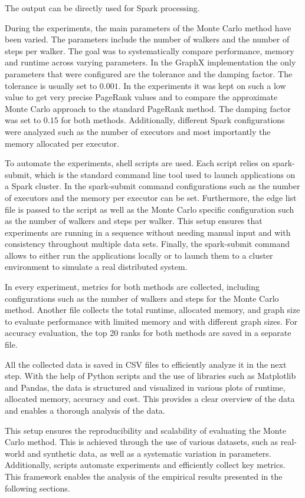 The output can be directly used for Spark processing.\par
During the experiments, the main parameters of the Monte Carlo method have been varied. The parameters include the number of walkers and the number of steps per walker. The goal was to systematically compare performance, memory and runtime across varying parameters. In the GraphX implementation the only parameters that were configured are the tolerance and the damping factor. The tolerance is usually set to $0.001$. In the experiments it was kept on such a low value to get very precise PageRank values and to compare the approximate Monte Carlo approach to the standard PageRank method. The damping factor was set to $0.15$ for both methods. Additionally, different Spark configurations were analyzed such as the number of executors and most importantly the memory allocated per executor. \par
To automate the experiments, shell scripts are used. Each script relies on spark-submit, which is the standard command line tool used to launch applications on a Spark cluster. In the spark-submit command configurations such as the number of executors and the memory per executor can be set. Furthermore, the edge list file is passed to the script as well as the Monte Carlo specific configuration such as the number of walkers and steps per walker. This setup ensures that experiments are running in a sequence without needing manual input and with consistency throughout multiple data sets. Finally, the spark-submit command allows to either run the applications locally or to launch them to a cluster environment to simulate a real distributed system. \par
In every experiment, metrics for both methods are collected, including configurations such as the number of walkers and steps for the Monte Carlo method. Another file collects the total runtime, allocated memory, and graph size to evaluate performance with limited memory and with different graph sizes. For accuracy evaluation, the top 20 ranks for both methods are saved in a separate file. \par
All the collected data is saved in CSV files to efficiently analyze it in the next step. With the help of Python scripts and the use of libraries such as Matplotlib and Pandas, the data is structured and visualized in various plots of runtime, allocated memory, accuracy and cost. This provides a clear overview of the data and enables a thorough analysis of the data. \par
This setup ensures the reproducibility and scalability of evaluating the Monte Carlo method. This is achieved through the use of various datasets, such as real-world and synthetic data, as well as a systematic variation in parameters. Additionally, scripts automate experiments and efficiently collect key metrics. This framework enables the analysis of the empirical results presented in the following sections. \par

